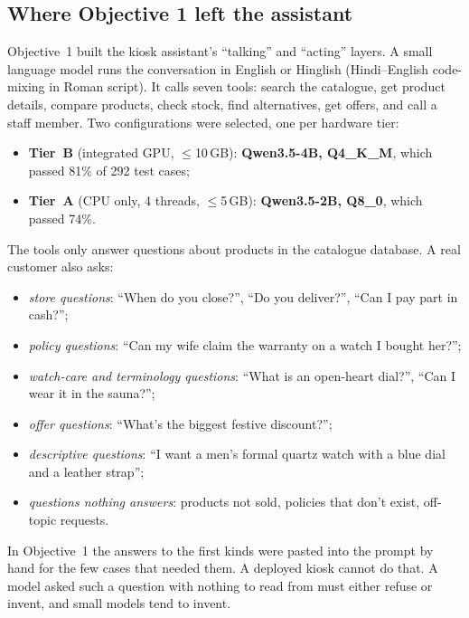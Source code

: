 \documentclass[11pt,a4paper]{article}
\begin{document}
\subsection{Where Objective 1 left the assistant}
Objective~1 built the kiosk assistant's ``talking'' and ``acting'' layers. A small language model runs the
conversation in English or Hinglish (Hindi--English code-mixing in Roman script). It calls seven tools: search the
catalogue, get product details, compare products, check stock, find alternatives, get offers, and call a staff member.
Two configurations were selected, one per hardware tier:
\begin{itemize}
  \item \textbf{Tier~B} (integrated GPU, $\le$10\,GB): \textbf{Qwen3.5-4B, Q4\_K\_M}, which passed 81\% of 292 test cases;
  \item \textbf{Tier~A} (CPU only, 4 threads, $\le$5\,GB): \textbf{Qwen3.5-2B, Q8\_0}, which passed 74\%.
\end{itemize}

The tools only answer questions about products in the catalogue database. A real customer also asks:
\begin{itemize}
  \item \emph{store questions}: ``When do you close?'', ``Do you deliver?'', ``Can I pay part in cash?'';
  \item \emph{policy questions}: ``Can my wife claim the warranty on a watch I bought her?'';
  \item \emph{watch-care and terminology questions}: ``What is an open-heart dial?'', ``Can I wear it in the sauna?'';
  \item \emph{offer questions}: ``What's the biggest festive discount?'';
  \item \emph{descriptive questions}: ``I want a men's formal quartz watch with a blue dial and a leather strap'';
  \item \emph{questions nothing answers}: products not sold, policies that don't exist, off-topic requests.
\end{itemize}
In Objective~1 the answers to the first kinds were pasted into the prompt by hand for the few cases that needed them.
A deployed kiosk cannot do that. A model asked such a question with nothing to read from must either refuse or invent,
and small models tend to invent.
\end{document}
